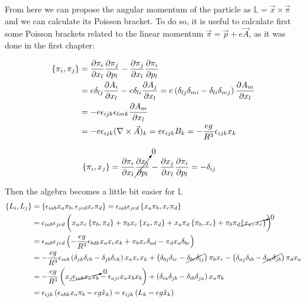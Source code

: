 From here we can propose the angular momentum of the particle as $\mathbb{L}= \vec{x}\times\vec{\pi}$ and we can calculate its Poisson bracket. To do so, it is useful to calculate first some Poisson brackets related to the linear momentum $\vec{\pi} = \vec{p} + e\vec{A}$, as it was done in the first chapter:


\begin{align*}
\left\lbrace \pi_i, \pi_j \right\rbrace &= \frac{\partial \pi_i}{\partial x_l}\frac{\partial \pi_j}{\partial p_l} - \frac{\partial \pi_j}{\partial x_l}\frac{\partial \pi_i}{\partial p_l}\\
&= e\delta_{lj}\frac{\partial A_i}{\partial x_l} -e\delta_{li}\frac{\partial A_j}{\partial x_l}            = e\left( \delta_{lj}\delta_{mi} - \delta_{li}\delta_{mj} \right)\frac{\partial A_m}{\partial x_l} \\
&= -e\epsilon_{ijk}\epsilon_{lmk}\frac{\partial A_m}{\partial x_l}\\
&= -e\epsilon_{ijk}(\nabla \times \vec{A})_k = e\epsilon_{ijk}B_k = -\frac{eg}{R^3}\epsilon_{ijk}x_k
\end{align*}

\begin{align*}
\left\lbrace \pi_i, x_j \right\rbrace &= \frac{\partial \pi_i}{\partial x_l}\cancelto{0}{\frac{\partial x_j}{\partial p_l}} - \frac{\partial x_j}{\partial x_l}\frac{\partial \pi_i}{\partial p_l} =  -\delta_{ij}
\end{align*}

Then the algebra becomes a little bit easier for $\mathbb{L}$
\begin{align*}
\left\lbrace L_i, L_j \right\rbrace &= \left\lbrace \epsilon_{iab}x_a\pi_b, \epsilon_{jcd}x_c\pi_d \right\rbrace = \epsilon_{iab}\epsilon_{jcd}\left\lbrace x_a\pi_b, x_c\pi_d \right\rbrace\\
&= \epsilon_{iab}\epsilon_{jcd}\left( x_ax_c\left\lbrace \pi_b, \pi_d \right\rbrace+\pi_bx_c\left\lbrace x_a, \pi_d \right\rbrace            +x_a\pi_d\left\lbrace \pi_b, x_c \right\rbrace + \pi_b\pi_d\cancelto{0}{\left\lbrace x_a, x_c \right\rbrace} \right)\\
&= \epsilon_{iab}\epsilon_{jcd}\left( -\frac{eg}{R^3}\epsilon_{bdk}x_ax_cx_k+\pi_bx_c\delta_{ad}-\pi_dx_a\delta_{bc} \right)\\
&= -\frac{eg}{R^3}\epsilon_{iab}\left( \delta_{jk}\delta_{cb} - \delta_{jb}\delta_{ck} \right)x_ax_cx_k + \left( \delta_{bj}\delta_{ic} - \cancel{\delta_{bc}\delta_{ij}} \right)\pi_bx_c - \left( \delta_{aj}\delta_{ib} - \cancel{\delta_{ia}\delta_{jb}} \right)\pi_dx_a\\
& = -\frac{eg}{R^3}\left( x_j\cancelto{0}{\epsilon_{iab}x_ax_b}-\epsilon_{aji}x_a{x_bx_b} \right)             +\left( \delta_{ia}\delta_{jb}-\delta_{ib}\delta_{ja} \right)x_a\pi_b\\
& = \epsilon_{ijk}\left( \epsilon_{abk}x_a\pi_b-{eg}\hat{x}_k \right) = \epsilon_{ijk}\left( L_k-{eg}\hat{x}_k \right)
\end{align*}

